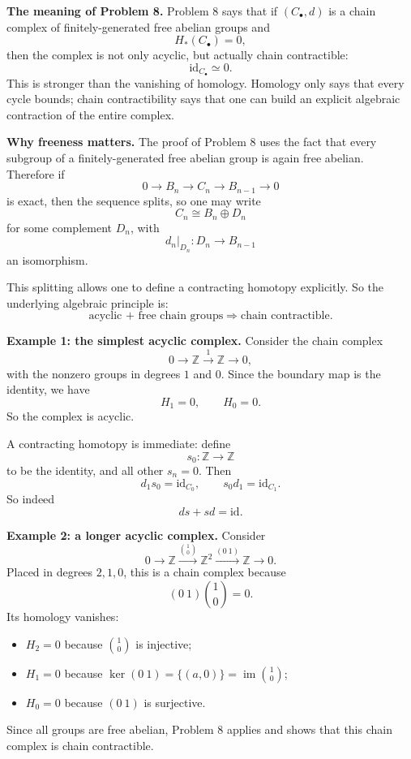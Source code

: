 \documentclass[12pt,a4paper]{article}
\theoremstyle{notespace}
\begin{document}
\medskip

\textbf{The meaning of Problem 8.}
Problem 8 says that if \((C_\bullet,d)\) is a chain complex of finitely-generated free abelian groups and
\[
H_*(C_\bullet)=0,
\]
then the complex is not only acyclic, but actually chain contractible:
\[
\mathrm{id}_{C_\bullet}\simeq 0.
\]
This is stronger than the vanishing of homology. Homology only says that every cycle bounds; chain contractibility says that one can build an explicit algebraic contraction of the entire complex.

\medskip

\textbf{Why freeness matters.}
The proof of Problem 8 uses the fact that every subgroup of a finitely-generated free abelian group is again free abelian. Therefore if
\[
0\to B_n\to C_n\to B_{n-1}\to 0
\]
is exact, then the sequence splits, so one may write
\[
C_n\cong B_n\oplus D_n
\]
for some complement \(D_n\), with
\[
d_n|_{D_n}:D_n\to B_{n-1}
\]
an isomorphism.

This splitting allows one to define a contracting homotopy explicitly. So the underlying algebraic principle is:
\[
\text{acyclic + free chain groups} \Longrightarrow \text{chain contractible}.
\]

\medskip

\textbf{Example 1: the simplest acyclic complex.}
Consider the chain complex
\[
0\longrightarrow \mathbb Z \xrightarrow{\;1\;} \mathbb Z \longrightarrow 0,
\]
with the nonzero groups in degrees \(1\) and \(0\). Since the boundary map is the identity, we have
\[
H_1=0,\qquad H_0=0.
\]
So the complex is acyclic.

A contracting homotopy is immediate: define
\[
s_0:\mathbb Z\to \mathbb Z
\]
to be the identity, and all other \(s_n=0\). Then
\[
d_1s_0=\mathrm{id}_{C_0},
\qquad
s_0d_1=\mathrm{id}_{C_1}.
\]
So indeed
\[
ds+sd=\mathrm{id}.
\]

\medskip

\textbf{Example 2: a longer acyclic complex.}
Consider
\[
0\to \mathbb Z \xrightarrow{\binom{1}{0}} \mathbb Z^2 \xrightarrow{(0\ 1)} \mathbb Z \to 0.
\]
Placed in degrees \(2,1,0\), this is a chain complex because
\[
(0\ 1)\binom{1}{0}=0.
\]
Its homology vanishes:
\begin{itemize}
	\item \(H_2=0\) because \(\binom{1}{0}\) is injective;
	\item \(H_1=0\) because \(\ker(0\ 1)=\{(a,0)\}=\operatorname{im}\binom{1}{0}\);
	\item \(H_0=0\) because \((0\ 1)\) is surjective.
\end{itemize}
Since all groups are free abelian, Problem 8 applies and shows that this chain complex is chain contractible.
\end{document}
